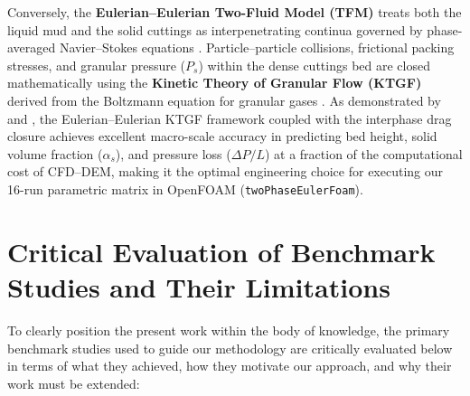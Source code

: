Conversely, the \textbf{Eulerian--Eulerian Two-Fluid Model (TFM)} treats both the liquid mud and the solid cuttings as interpenetrating continua governed by phase-averaged Navier--Stokes equations \citep{Shehab2015, Hajipour2020, Khaled2020}. Particle--particle collisions, frictional packing stresses, and granular pressure ($P_s$) within the dense cuttings bed are closed mathematically using the \textbf{Kinetic Theory of Granular Flow (KTGF)} derived from the Boltzmann equation for granular gases \citep{Gidaspow1994, Syamlal1993, Hajipour2020}. As demonstrated by \citet{Hajipour2020} and \citet{Khaled2020}, the Eulerian--Eulerian KTGF framework coupled with the \citet{Wen1966} interphase drag closure achieves excellent macro-scale accuracy in predicting bed height, solid volume fraction ($\alpha_s$), and pressure loss ($\Delta P/L$) at a fraction of the computational cost of CFD--DEM, making it the optimal engineering choice for executing our 16-run parametric matrix in OpenFOAM (\texttt{twoPhaseEulerFoam}).

\section{Critical Evaluation of Benchmark Studies and Their Limitations}
To clearly position the present work within the body of knowledge, the primary benchmark studies used to guide our methodology are critically evaluated below in terms of what they achieved, how they motivate our approach, and why their work must be extended:

